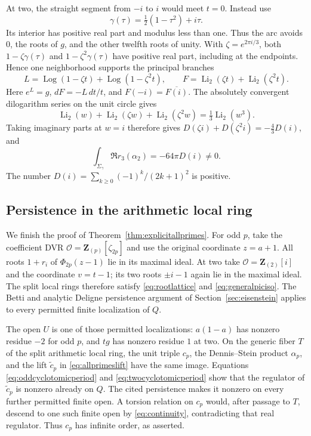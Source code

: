 \documentclass[11pt,a4paper]{article}
\theoremstyle{remark}
\newcommand{\Z}{\mathbf Z}
\newcommand{\OO}{\mathcal O}
\begin{document}
At two, the straight segment from $-i$ to $i$ would meet $t=0$.
Instead use
\[
 \gamma(\tau)=\tfrac12(1-\tau^2)+i\tau .
\]
Its interior has positive real part and modulus less than one.
Thus the arc avoids $0$, the roots of $g$, and the other twelfth
roots of unity. With $\zeta=e^{2\pi i/3}$, both
$1-\zeta\gamma(\tau)$ and $1-\zeta^2\gamma(\tau)$ have positive
real part, including at the endpoints. Hence one neighborhood
supports the principal branches
\[
 L=\operatorname{Log}(1-\zeta t)+\operatorname{Log}(1-\zeta^2t),
 \qquad
 F=\operatorname{Li}_2(\zeta t)+\operatorname{Li}_2(\zeta^2t).
\]
Here $e^L=g$, $dF=-L\,dt/t$, and
$F(-i)=\overline{F(i)}$.
The absolutely convergent dilogarithm series on the unit circle gives
\[
 \operatorname{Li}_2(w)+\operatorname{Li}_2(\zeta w)
 +\operatorname{Li}_2(\zeta^2w)=\tfrac13\operatorname{Li}_2(w^3).
\]
Taking imaginary parts at $w=i$ therefore gives
$D(\zeta i)+D(\zeta^2i)=-\tfrac43D(i)$, and
\begin{equation}\label{eq:twocyclotomicperiod}
 \int_{\Sigma_\gamma}\Re r_3(\alpha_2)
 =-64\pi D(i)\ne0.
\end{equation}
The number $D(i)=\sum_{k\geq0}(-1)^k/(2k+1)^2$ is positive.

\subsection{Persistence in the arithmetic local ring}

We finish the proof of Theorem~\ref{thm:explicitallprimes}.
For odd $p$, take the coefficient DVR
$\OO=\Z_{(p)}[\zeta_{2p}]$ and use the original coordinate $z=a+1$.
All roots $1+r_i$ of $\Phi_{2p}(z-1)$ lie in its maximal ideal.
At two take $\OO=\Z_{(2)}[i]$ and the coordinate $v=t-1$; its
two roots $\pm i-1$ again lie in the maximal ideal.
The split local rings therefore satisfy \eqref{eq:rootlattice}
and \eqref{eq:generalpiciso}. The Betti and analytic Deligne
persistence argument of Section~\ref{sec:eisenstein} applies to
every permitted finite localization of $Q$.

The open $U$ is one of those permitted localizations:
$a(1-a)$ has nonzero residue $-2$ for odd $p$, and $tg$ has
nonzero residue $1$ at two. On the generic fiber $T$ of the split
arithmetic local ring, the unit triple $c_p$, the Dennis--Stein
product $\alpha_p$, and the lift $\widetilde c_p$ in
\eqref{eq:allprimeslift} have the same image.
Equations \eqref{eq:oddcyclotomicperiod} and
\eqref{eq:twocyclotomicperiod} show that the regulator of
$\widetilde c_p$ is nonzero already on $Q$.
The cited persistence makes it nonzero on every further permitted
finite open. A torsion relation on $c_p$ would, after passage to
$T$, descend to one such finite open by \eqref{eq:continuity},
contradicting that real regulator.
Thus $c_p$ has infinite order, as asserted.
\end{document}
